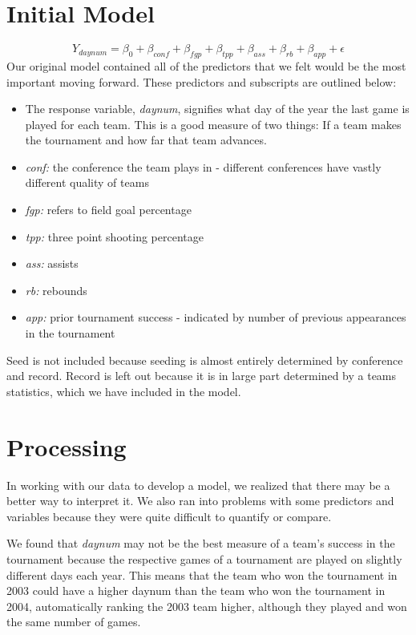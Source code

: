 \documentclass[]{scrartcl}
\begin{document}
\section*{Initial Model}
	\[
Y_{daynum} = \beta_0 + \beta_{conf} + \beta_{fgp} +\beta_{tpp} + \beta_{ass} + \beta_{rb} + \beta_{app} + \epsilon
\]
Our original model contained all of the predictors that we felt would be the most important moving forward. These predictors and subscripts are outlined below:
	\begin{itemize}
	\item The response variable, {\textit{daynum}}, signifies what day of the year the last game is played for each team. This is a good measure of two things: If a team makes the tournament and how far that team advances.
	\item 	{\textit{conf:}} the conference the team plays in - different conferences have vastly different quality of teams
	\item 	{\textit{fgp:}} refers to field goal percentage
	\item 	{\textit{tpp:}} three point shooting percentage
	\item 	{\textit{ass:}} assists
	\item 	{\textit{rb:}} rebounds
	\item 	{\textit{app:}} prior tournament success - indicated by number of previous appearances in the tournament
	\end{itemize}
Seed is not included because seeding is almost entirely determined by conference and record. Record is left out because it is in large part determined by a teams statistics, which we have included in the model.
\section*{Processing}
In working with our data to develop a model, we realized that there may be a better way to interpret it. We also ran into problems with some predictors and variables because they were quite difficult to quantify or compare.

We found that {\textit{daynum}} may not be the best measure of a team's success in the tournament because the respective games of a tournament are played on slightly different days each year. This means that the team who won the tournament in 2003 could have a higher daynum than the team who won the tournament in 2004, automatically ranking the 2003 team higher, although they played and won the same number of games.
\end{document}
